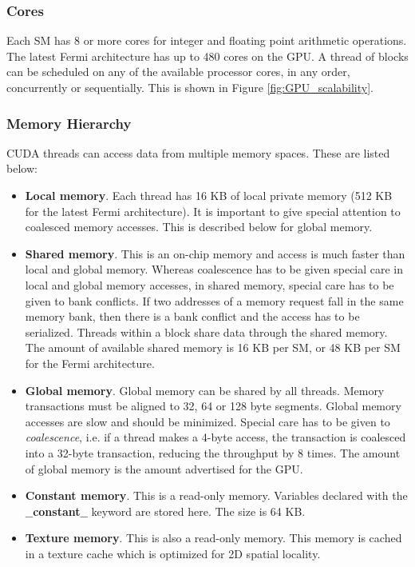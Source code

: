 \documentclass{article}
\begin{document}
\subsubsection{Cores}
Each SM has 8 or more cores for integer and floating point arithmetic operations.  The latest Fermi architecture has up to 480 cores on the GPU.  A thread of blocks can be scheduled on any of the available processor cores, in any order, concurrently or sequentially.  This is shown in Figure \ref{fig:GPU_scalability}.

\subsubsection{Memory Hierarchy}
CUDA threads can access data from multiple memory spaces.  These are listed below:
\begin{itemize}
	\item \textbf{Local memory}.  Each thread has 16 KB of local private memory (512 KB for the latest Fermi architecture).  It is important to give special attention to coalesced memory accesses.  This is described below for global memory.  
	\item \textbf{Shared memory}.  This is an on-chip memory and access is much faster than local and global memory.  Whereas coalescence has to be given special care in local and global memory accesses, in shared memory, special care has to be given to bank conflicts.  If two addresses of a memory request fall in the same memory bank, then there is a bank conflict and the access has to be serialized.  Threads within a block share data through the shared memory.  The amount of available shared memory is 16 KB per SM, or 48 KB per SM for the Fermi architecture.
	\item \textbf{Global memory}.  Global memory can be shared by all threads.  Memory transactions must be aligned to 32, 64 or 128 byte segments.  Global memory accesses are slow and should be minimized.  Special care has to be given to \emph{coalescence}, i.e. if a thread makes a 4-byte access, the transaction is coalesced into a 32-byte transaction, reducing the throughput by 8 times.  The amount of global memory is the amount advertised for the GPU.
	\item \textbf{Constant memory}.  This is a read-only memory.  Variables declared with the $\_\_$\textbf{constant}$\_\_$ keyword are stored here.  The size is 64 KB.  
	\item \textbf{Texture memory}.  This is also a read-only memory.  This memory is cached in a texture cache which is optimized for 2D spatial locality.
\end{itemize}
\end{document}
